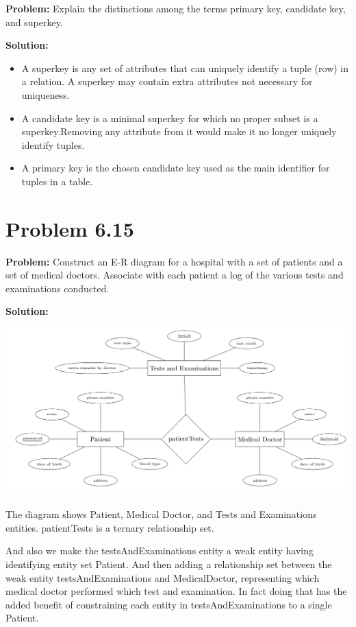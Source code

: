 \documentclass[12pt,a4paper]{article}
\begin{document}
\textbf{Problem:} Explain the distinctions among the terms primary key, candidate key, and superkey.

\textbf{Solution:}
\begin{itemize}
\item A superkey is any set of attributes that can uniquely identify a tuple (row) in a relation. A superkey may contain extra attributes not necessary for uniqueness.
\item A candidate key is a minimal superkey for which no proper subset is a superkey.Removing any attribute from it would make it no longer uniquely identify tuples.
\item A primary key is the chosen candidate key used as the main identifier for tuples in a table.
\end{itemize}
\newpage
\section*{Problem 6.15}

\textbf{Problem:} Construct an E-R diagram for a hospital with a set of patients and a set of medical doctors. Associate with each patient a log of the various tests and examinations conducted.

\textbf{Solution:}

\begin{center}
\includegraphics[width=1\textwidth]{6.15.png}
\end{center}

The diagram shows Patient, Medical Doctor, and Tests and Examinations entities. patientTests is a ternary relationship set.

And also we make the testsAndExaminations entity a weak entity having identifying entity set Patient. And then adding a relationship set between the weak entity testsAndExaminations and MedicalDoctor, representing which medical doctor performed which test and examination. In fact doing that has the added benefit of constraining each entity in testsAndExaminations to a single Patient.
\end{document}
